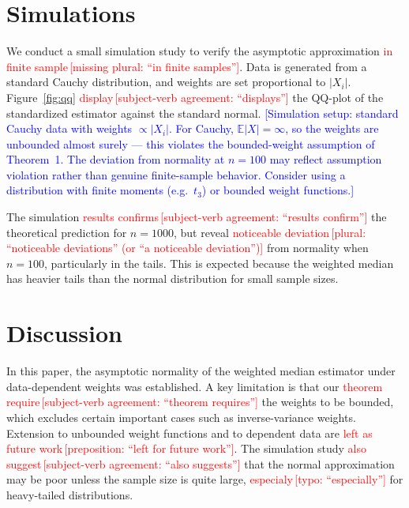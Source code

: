 \documentclass[12pt]{article}
\newcommand{\grammarcheck}[2]{\textcolor{red}{#1}\,\textcolor{red}{[#2]}}
\newcommand{\techcheck}[1]{\textcolor{blue}{[#1]}}
\begin{document}
\section{Simulations}

We conduct a small simulation study to verify the asymptotic approximation \grammarcheck{in finite sample}{missing plural: ``in finite samples''}. Data is generated from a standard Cauchy distribution, and weights are set proportional to $|X_i|$. Figure~\ref{fig:qq} \grammarcheck{display}{subject-verb agreement: ``displays''} the QQ-plot of the standardized estimator against the standard normal.
\techcheck{Simulation setup: standard Cauchy data with weights $\propto |X_i|$. For Cauchy, $\mathbb{E}|X| = \infty$, so the weights are unbounded almost surely --- this violates the bounded-weight assumption of Theorem~1. The deviation from normality at $n=100$ may reflect assumption violation rather than genuine finite-sample behavior. Consider using a distribution with finite moments (e.g.\ $t_3$) or bounded weight functions.}

The simulation \grammarcheck{results confirms}{subject-verb agreement: ``results confirm''} the theoretical prediction for $n = 1000$, but reveal \grammarcheck{noticeable deviation}{plural: ``noticeable deviations'' (or ``a noticeable deviation'')} from normality when $n = 100$, particularly in the tails. This is expected because the weighted median has heavier tails than the normal distribution for small sample sizes.

\section{Discussion}

In this paper, the asymptotic normality of the weighted median estimator under data-dependent weights was established. A key limitation is that our \grammarcheck{theorem require}{subject-verb agreement: ``theorem requires''} the weights to be bounded, which excludes certain important cases such as inverse-variance weights. Extension to unbounded weight functions and to dependent data are \grammarcheck{left as future work}{preposition: ``left for future work''}. The simulation study \grammarcheck{also suggest}{subject-verb agreement: ``also suggests''} that the normal approximation may be poor unless the sample size is quite large, \grammarcheck{especialy}{typo: ``especially''} for heavy-tailed distributions.
\end{document}
